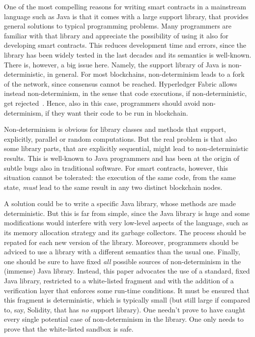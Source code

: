 One of the most compelling reasons for writing smart contracts
in a mainstream language such as Java is that it comes with a large
support library, that provides general solutions to typical programming problems.
Many programmers are familiar with that library and appreciate the possibility
of using it also for developing smart contracts. This reduces
development time and errors, since the library has been widely tested
in the last decades and its semantics is well-known. There is, however, a big
issue here. Namely, the support library of Java is non-deterministic, in general.
For most blockchains, non-determinism leads to a fork of the network, since
consensus cannot be reached. Hyperledger Fabric allows instead non-determinism,
in the sense that code executions, if non-deterministic, get rejected~\cite{Vukolic17}.
Hence, also in this case, programmers should avoid non-determinism, if they want their code to be
run in blockchain.

Non-determinism is obvious for library classes and methods that support, explicitly,
parallel or random computations. But the real problem is that
also some library parts, that are explicitly sequential, might lead to
non-deterministic results.
This is well-known to Java programmers and has been at the origin of subtle
bugs also in traditional software. For smart contracts, however,
this situation cannot be tolerated: the execution of the same code, from the same state,
\emph{must} lead to the same result in any two distinct blockchain nodes.

A solution could be to write a specific Java library, whose
methods are made deterministic. But this is far from simple, since the Java library is huge
and some modifications would interfere with very low-level aspects of the language, such as
its memory allocation strategy and its garbage collectors.
The process should be repated for each new version of the library.
Moreover, programmers should be adviced to use a library with a different semantics than the usual one.
Finally, one should be sure to have fixed \emph{all} possible sources of non-determinism in the
(immense) Java library.
Instead, this paper advocates the use of a standard, fixed Java library, restricted to a white-listed
fragment and with the addition of a verification layer that enforces some run-time conditions.
It must be ensured that this fragment is deterministic, which is typically small (but still
large if compared to, say, Solidity, that has \emph{no} support library). One needn't prove
to have caught every single potential case of non-determinism in the library. One only needs to
prove that the white-listed sandbox is safe.

